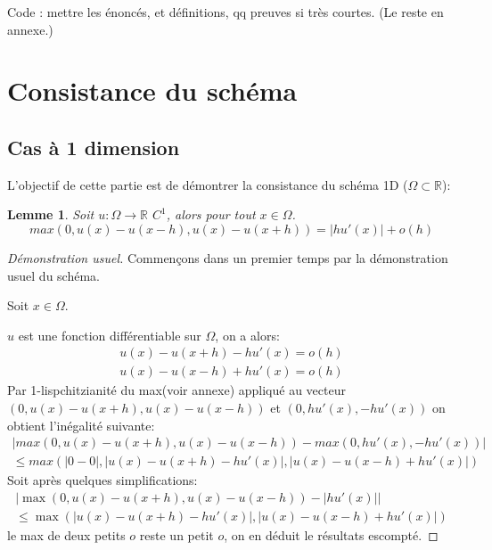 \documentclass[12pt]{article}
\def\bR{\mathbb{R}}
\newtheorem{lemma}[theorem]{Lemme}
\numberwithin{equation}{section}
\begin{document}
Code : mettre les énoncés, et définitions, qq preuves si très courtes.
(Le reste en annexe.)



\section{Consistance du schéma}

\subsection{Cas à 1 dimension}


L'objectif de cette partie est de démontrer la consistance du schéma 1D ($\Omega\subset \bR$):
\begin{lemma}
Soit $u: \Omega \to \bR$ $C^1$, alors pour tout $x\in\Omega$.
\begin{equation}
    max(0,u(x)-u(x-h),u(x)-u(x+h))=|hu'(x)|+o(h)
\end{equation}
\end{lemma}


\begin{proof}[Démonstration usuel]
Commençons dans un premier temps par la démonstration usuel du schéma.

Soit $x\in \Omega$.

$u$ est une fonction différentiable sur $\Omega$, on a alors:
\begin{equation*}
\begin{split}
    u(x)-u(x+h)-hu'(x)=o(h) \\
    u(x)-u(x-h)+hu'(x)=o(h)
\end{split}
\end{equation*}
Par 1-lispchitzianité du max(voir annexe) appliqué au vecteur $(0,u(x)-u(x+h),u(x)-u(x-h))$ et $(0,hu'(x),-hu'(x))$ on obtient l'inégalité suivante:
\begin{equation*}
\begin{split}
    |max(0,u(x)-u(x+h),u(x)-u(x-h))-max(0,hu'(x),-hu'(x)) | \\ \le max(|0-0|,|u(x)-u(x+h)-hu'(x)|,|u(x)-u(x-h)+hu'(x)|)
\end{split}
\end{equation*}
Soit après quelques simplifications:
\begin{equation*}
\begin{split}
    |\max(0,u(x)-u(x+h),u(x)-u(x-h))-|hu'(x)||\\
    \le \max(|u(x)-u(x+h)-hu'(x)|,|u(x)-u(x-h)+hu'(x)|)
\end{split}
\end{equation*}
le max de deux petits $o$ reste un petit $o$, on en déduit le résultats escompté.
\end{proof}
\end{document}
